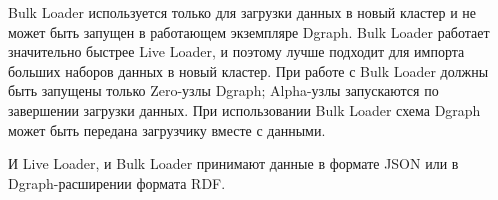 Bulk Loader используется только для загрузки данных в новый кластер и не может быть запущен в работающем экземпляре
Dgraph. Bulk Loader работает значительно быстрее Live Loader, и поэтому лучше подходит для импорта больших наборов
данных в новый кластер. При работе с Bulk Loader должны быть запущены только Zero-узлы Dgraph; Alpha-узлы запускаются
по завершении загрузки данных. При использовании Bulk Loader схема Dgraph может быть передана загрузчику вместе с
данными.

И Live Loader, и Bulk Loader принимают данные в формате JSON или в Dgraph-расширении формата RDF.
